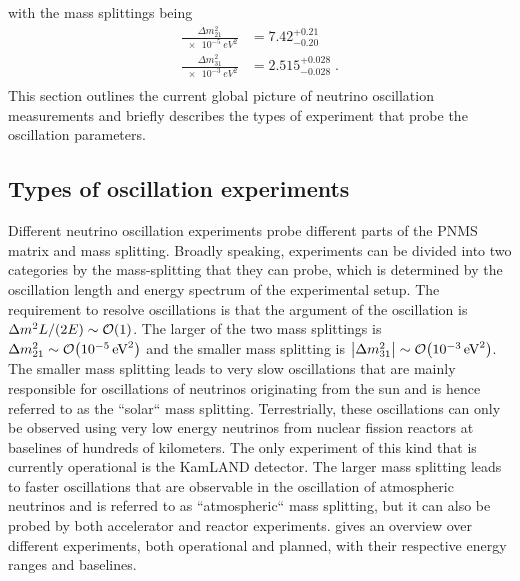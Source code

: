 with the mass splittings being
\begin{equation}
    \begin{aligned}
        \frac{\Delta m^2_{21}}{\SI{e-5}{eV^2}} &= 7.42^{+0.21}_{-0.20} \\
        \frac{\Delta m^2_{31}}{\SI{e-3}{eV^2}} &= 2.515^{+0.028}_{-0.028}\;. \\
    \end{aligned}
\end{equation}
This section outlines the current global picture of neutrino oscillation measurements and briefly describes the types of experiment that probe the oscillation parameters.

\subsection{Types of oscillation experiments}

Different neutrino oscillation experiments probe different parts of the PNMS matrix and mass splitting. Broadly speaking, experiments can be divided into two categories by the mass-splitting that they can probe, which is determined by the oscillation length and energy spectrum of the experimental setup.   The requirement to resolve oscillations is that the argument of the oscillation is $\Delta m^2 L/(2E) \sim \order{1}$. The larger of the two mass splittings is $\Delta m^2_{21} \sim \order{\SI{e-5}{eV^2}}$ and the smaller mass splitting is $\abs{\Delta m^2_{31}} \sim \order{\SI{e-3}{eV^2}}$. The smaller mass splitting leads to very slow oscillations that are mainly responsible for oscillations of neutrinos originating from the sun and is hence referred to as the ``solar`` mass splitting. Terrestrially, these oscillations can only be observed using very low energy neutrinos from nuclear fission reactors at baselines of hundreds of kilometers. The only experiment of this kind that is currently operational is the KamLAND detector\cite{PhysRevLett.90.021802}. The larger mass splitting leads to faster oscillations that are observable in the oscillation of atmospheric neutrinos and is referred to as ``atmospheric`` mass splitting, but it can also be probed by both accelerator and reactor experiments.  gives an overview over different experiments, both operational and planned, with their respective energy ranges and baselines.


